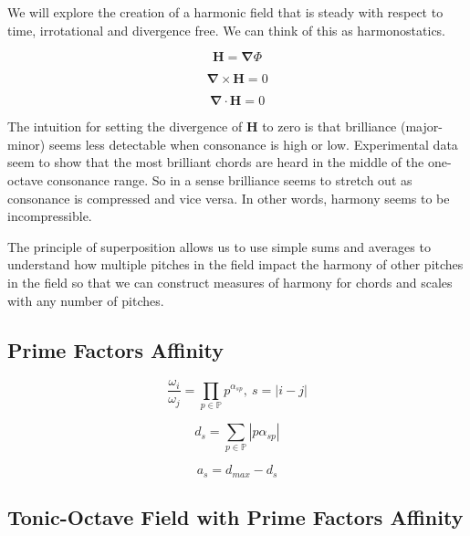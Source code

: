 \documentclass[sn-mathphys]{sn-jnl}%
\begin{document}
We will explore the creation of a harmonic field that is steady with respect to time, irrotational and divergence free. We can think of this as harmonostatics. 

\begin{equation}
  \boldsymbol{H} = \boldsymbol{\nabla}\Phi\label{gradPhiEq}
\end{equation}

\begin{equation}
  \boldsymbol{\nabla \times H}=0\label{harmonyCurlStaticsEq}
\end{equation}

\begin{equation}
  \boldsymbol{\nabla \cdot H}=0\label{harmonyFieldStaticsEq}
\end{equation}

The intuition for setting the divergence of $\mathbf{H}$ to zero is that brilliance (major-minor) seems less detectable when consonance is high or low. Experimental data seem to show that the most brilliant chords are heard in the middle of the one-octave consonance range. So in a sense brilliance seems to stretch out as consonance is compressed and vice versa. In other words, harmony seems to be incompressible.

The principle of superposition allows us to use simple sums and averages to understand how multiple pitches in the field impact the harmony of other pitches in the field so that we can construct measures of harmony for chords and scales with any number of pitches.

\subsection{Prime Factors Affinity}

\begin{equation}
  \frac{\omega_{i}}{\omega_{j}} = \prod_{p \in \mathbb{P}} p^{\alpha_{sp}}, \ s=|i-j|
\end{equation}

\begin{equation}
  d_s = \sum_{p \in \mathbb{P}} \left| p \alpha_{sp} \right|
\end{equation}

\begin{equation}
  a_s= d_{max} - d_s
\end{equation}

\subsection{Tonic-Octave Field  with Prime Factors Affinity}
\end{document}
